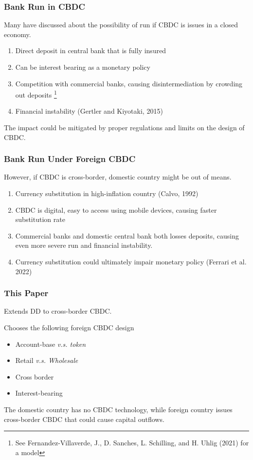 \begin{frame}
    \frametitle{Bank Run in CBDC}

    Many have discussed about the possibility of run if CBDC is issues in a closed economy.
    \begin{enumerate}[<+->]
        \item Direct deposit in central bank that is fully insured
        \item Can be interest bearing as a monetary policy
        \item Competition with commercial banks, causing disintermediation by crowding out deposits \footnote{See Fernandez-Villaverde, J., D. Sanches, L. Schilling, and H. Uhlig (2021) for a model}
        \item Financial instability (Gertler and Kiyotaki, 2015)
    \end{enumerate}
    \pause
    \vfill 
    The impact could be mitigated by proper regulations and limits on the design of CBDC.

\end{frame}

\begin{frame}
    \frametitle{Bank Run Under Foreign CBDC}

    However, if CBDC is cross-border, domestic country might be out of means.

    \begin{enumerate}[<+->]
        \item Currency substitution in high-inflation country (Calvo, 1992)
        \item CBDC is digital, easy to access using mobile devices, causing faster substitution rate 
        \item Commercial banks and domestic central bank both losses deposits, causing even more severe run and financial instability.
        \item Currency substitution could ultimately impair monetary policy (Ferrari et al. 2022)
    \end{enumerate}

\end{frame}


\begin{frame}
    \frametitle{This Paper}

    Extends DD to cross-border CBDC.

    Chooses the following foreign CBDC design
    \begin{itemize}
        \item Account-base \emph{v.s. token}
        \item Retail \emph{v.s. Wholesale}
        \item Cross border
        \item Interest-bearing
    \end{itemize}
    \pause
    The domestic country has no CBDC technology, while foreign country issues cross-border CBDC that could cause capital outflows. 

\end{frame}

